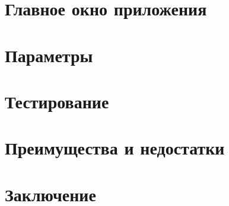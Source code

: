     \section{Главное окно приложения}
    \pagebreak

    \section{Параметры}
    \pagebreak

    \section{Тестирование}
    \pagebreak

    \section{Преимущества и недостатки}
    \pagebreak

    \section*{Заключение}
    \pagebreak

